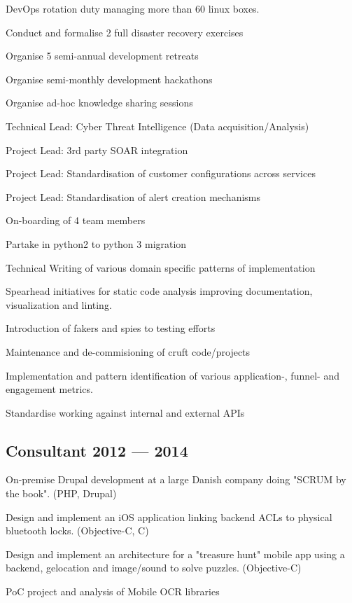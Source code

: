 \begin{zitemize}
	\item DevOps rotation duty managing more than 60 linux boxes.
	\item Conduct and formalise 2 full disaster recovery exercises
	\item Organise 5 semi-annual development retreats
	\item Organise semi-monthly development hackathons
	\item Organise ad-hoc knowledge sharing sessions
	\item Technical Lead: Cyber Threat Intelligence (Data acquisition/Analysis)
	\item Project Lead: 3rd party SOAR integration
	\item Project Lead: Standardisation of customer configurations across services
	\item Project Lead: Standardisation of alert creation mechanisms
	\item On-boarding of 4 team members
	\item Partake in python2 to python 3 migration
	\item Technical Writing of various domain specific patterns of implementation
	\item Spearhead initiatives for static code analysis improving documentation, visualization and linting.
	\item Introduction of fakers and spies to testing efforts
	\item Maintenance and de-commisioning of cruft code/projects
	\item Implementation and pattern identification of various application-, funnel- and engagement metrics.
	\item Standardise working against internal and external APIs
\end{zitemize}

\subsection{{Consultant \hfill 2012 --- 2014}}

\begin{zitemize}
	\item On-premise Drupal development at a large Danish company doing "SCRUM by the book". (PHP, Drupal)
	\item Design and implement an iOS application linking backend ACLs to physical bluetooth locks. (Objective-C, C)
	\item Design and implement an architecture for a "treasure hunt" mobile app using a backend, gelocation and image/sound to solve
puzzles. (Objective-C)
	\item PoC project and analysis of Mobile OCR libraries
\end{zitemize}

